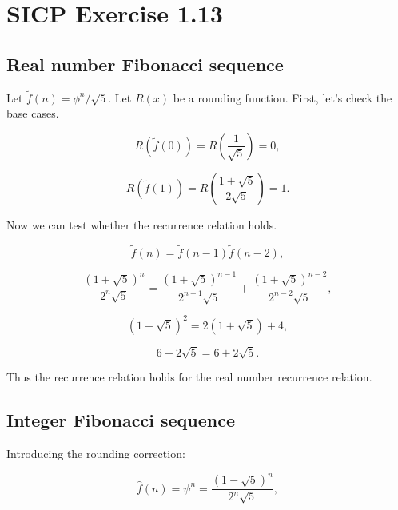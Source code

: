 \documentclass{article}
\author{J L Kaplan}
\begin{document}
\section*{SICP Exercise 1.13}

\subsection*{Real number Fibonacci sequence}

Let $\tilde{f}(n) = \phi^n / \sqrt{5}$. Let $R(x)$ be a rounding function. First, let's check the base cases.

\begin{equation}
  R(\tilde{f}(0)) = R \left( \frac{1}{\sqrt{5}} \right) = 0,
\end{equation}

\begin{equation}
  R(\tilde{f}(1)) = R \left( \frac{1 + \sqrt{5}}{2 \sqrt{5}} \right) = 1.
\end{equation}

Now we can test whether the recurrence relation holds.

\begin{equation}
  \tilde{f}(n) = \tilde{f}(n-1) \tilde{f}(n-2),
\end{equation}

\begin{equation}
  \frac{(1 + \sqrt{5})^n}{2^n \sqrt{5}} = \frac{(1 + \sqrt{5})^{n-1}}{2^{n-1} \sqrt{5}} + \frac{(1 + \sqrt{5})^{n-2}}{2^{n-2} \sqrt{5}},
\end{equation}

\begin{equation}
  (1 + \sqrt{5})^2 = 2 (1 + \sqrt{5}) + 4,
\end{equation}

\begin{equation}
  6 + 2 \sqrt{5} = 6 + 2 \sqrt{5}.
\end{equation}

Thus the recurrence relation holds for the real number recurrence relation.

\subsection*{Integer Fibonacci sequence}

Introducing the rounding correction:

\begin{equation}
  \hat{f}(n) = \psi^n = \frac{(1 - \sqrt{5})^n}{2^n \sqrt{5}},
\end{equation}
\end{document}
